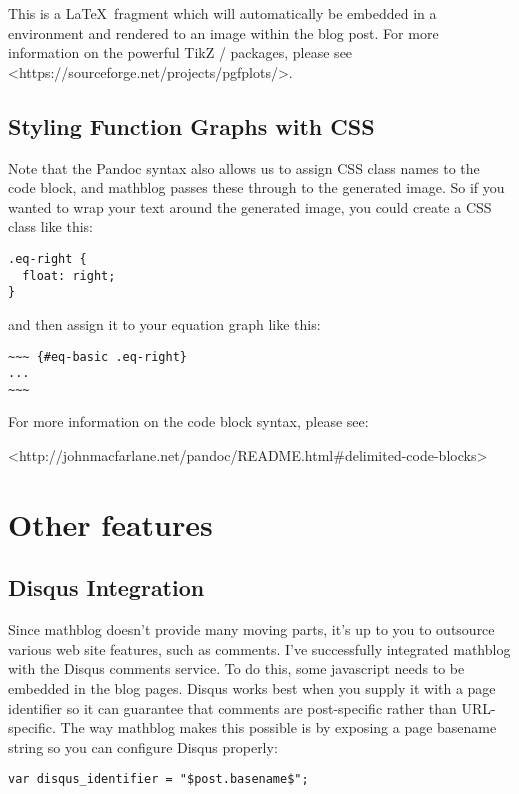\documentclass[11pt, letterpaper, oneside, titlepage]{book}
\begin{document}
This is a \LaTeX\ fragment which will automatically be embedded in a
 environment and rendered to an image within the blog
post.  For more information on the powerful TikZ / 
packages, please see <https://sourceforge.net/projects/pgfplots/>.

\subsection{Styling Function Graphs with CSS}

Note that the Pandoc syntax also allows us to assign CSS class names
to the code block, and mathblog passes these through to the generated
image.  So if you wanted to wrap your text around the generated image,
you could create a CSS class like this:

\begin{verbatim}
.eq-right {
  float: right;
}
\end{verbatim}

and then assign it to your equation graph like this:

\begin{verbatim}
~~~ {#eq-basic .eq-right}
...
~~~
\end{verbatim}

For more information on the code block syntax, please see:

<http://johnmacfarlane.net/pandoc/README.html\#delimited-code-blocks>

\section{Other features}

\subsection{Disqus Integration}

Since mathblog doesn't provide many moving parts, it's up to you to
outsource various web site features, such as comments.  I've
successfully integrated mathblog with the Disqus comments service.  To
do this, some javascript needs to be embedded in the blog pages.
Disqus works best when you supply it with a page identifier so it can
guarantee that comments are post-specific rather than URL-specific.
The way mathblog makes this possible is by exposing a page basename
string so you can configure Disqus properly:

\begin{verbatim}
var disqus_identifier = "$post.basename$";
\end{verbatim}
\end{document}
